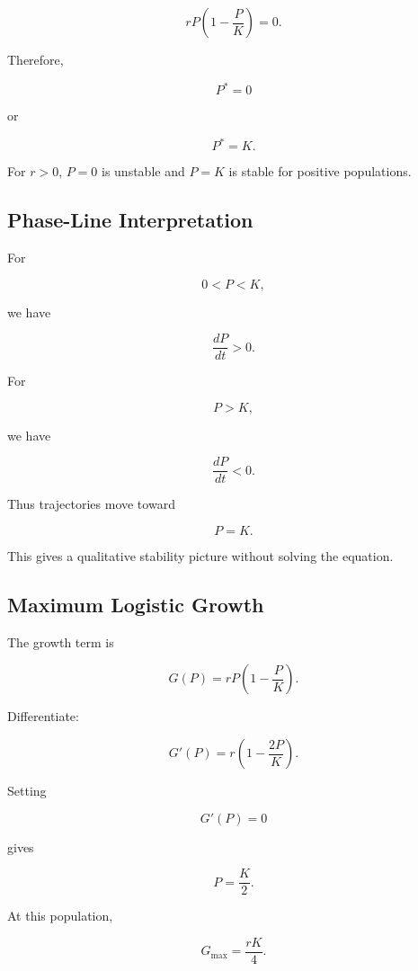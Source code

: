 \[
rP
\left(
1-\frac{P}{K}
\right)
=
0.
\]

Therefore,

\[
\boxed{
P^*=0
}
\]

or

\[
\boxed{
P^*=K.
}
\]

For \(r>0\), \(P=0\) is unstable and \(P=K\) is stable for positive
populations.

\subsection{Phase-Line Interpretation}
\label{subsec:logistic-phase-line}

For

\[
0<P<K,
\]

we have

\[
\frac{dP}{dt}>0.
\]

For

\[
P>K,
\]

we have

\[
\frac{dP}{dt}<0.
\]

Thus trajectories move toward

\[
\boxed{
P=K.
}
\]

This gives a qualitative stability picture without solving the equation.

\subsection{Maximum Logistic Growth}
\label{subsec:maximum-logistic-growth}

The growth term is

\[
G(P)
=
rP
\left(
1-\frac{P}{K}
\right).
\]

Differentiate:

\[
G'(P)
=
r
\left(
1-\frac{2P}{K}
\right).
\]

Setting

\[
G'(P)=0
\]

gives

\[
\boxed{
P=\frac{K}{2}.
}
\]

At this population,

\[
\boxed{
G_{\max}
=
\frac{rK}{4}.
}
\]

